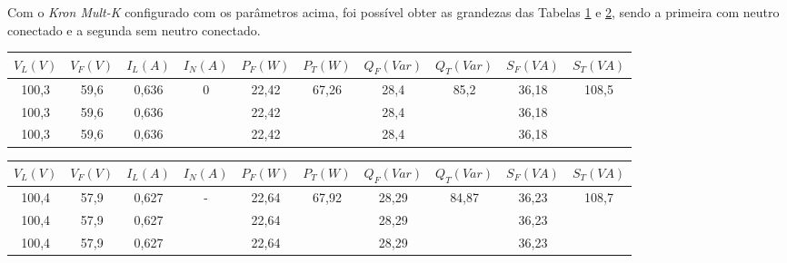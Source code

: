 \documentclass[a4paper,12pt,oneside,openany,table,xcdraw]{article}
\begin{document}
Com o \textit{Kron Mult-K} configurado com os parâmetros acima, foi possível obter as grandezas das Tabelas \ref{tab1} e \ref{tab2}, sendo a primeira com neutro conectado e a segunda sem neutro conectado.

\begin{table}[H]\scriptsize
\centering
\def\arraystretch{1.35}
\captionsetup{font=scriptsize}
 \label{tab1}

\begin{tabular}{|c|c|c|c|c|c|c|c|c|c|}
\hline
$V_{L} (V)$ & $V_{F} (V)$ & $I_{L} (A)$ & $I_{N} (A)$        & $P_{F} (W)$ & $P_{T} (W)$       & $Q_{F} (Var)$ & $Q_{T} (Var)$     & $S_{F} (VA)$ & $S_{T} (VA)$      \\ \hline
100,3       & 59,6           & 0,636       & \multirow{3}{*}{0} & 22,42       & \multirow{3}{*}{67,26} & 28,4          & \multirow{3}{*}{85,2} &  36,18            & \multirow{3}{*}{108,5} \\ \cline{1-3} \cline{5-5} \cline{7-7} \cline{9-9}
100,3       & 59,6           &  0,636           &                    & 22,42       &                   & 28,4              &                   &   36,18            &                   \\ \cline{1-3} \cline{5-5} \cline{7-7} \cline{9-9}
100,3       & 59,6           &   0,636          &                    & 22,42       &                   &  28,4             &                   & 36,18              &                   \\ \hline
\end{tabular}
\end{table}

\begin{table}[H]\scriptsize
\centering
\def\arraystretch{1.35}
\captionsetup{font=scriptsize}
 \label{tab2}

\begin{tabular}{|c|c|c|c|c|c|c|c|c|c|}
\hline
$V_{L} (V)$ & $V_{F} (V)$  & $I_{L} (A)$ & $I_{N} (A)$        & $P_{F} (W)$ & $P_{T} (W)$       & $Q_{F} (Var)$ & $Q_{T} (Var)$     & $S_{F} (VA)$ & $S_{T} (VA)$      \\ \hline
100,4       & 57,9           & 0,627       & \multirow{3}{*}{-} & 22,64       & \multirow{3}{*}{67,92} & 28,29         & \multirow{3}{*}{84,87} &  36,23            & \multirow{3}{*}{108,7} \\ \cline{1-3} \cline{5-5} \cline{7-7} \cline{9-9}
100,4       & 57,9           & 0,627              &                    & 22,64       &                   &  28,29             &                   &   36,23                      &                   \\ \cline{1-3} \cline{5-5} \cline{7-7} \cline{9-9}
100,4       & 57,9           &  0,627             &                    & 22,64       &                   &  28,29             &                   &  36,23                       &                   \\ \hline
\end{tabular}
\end{table}
\end{document}

